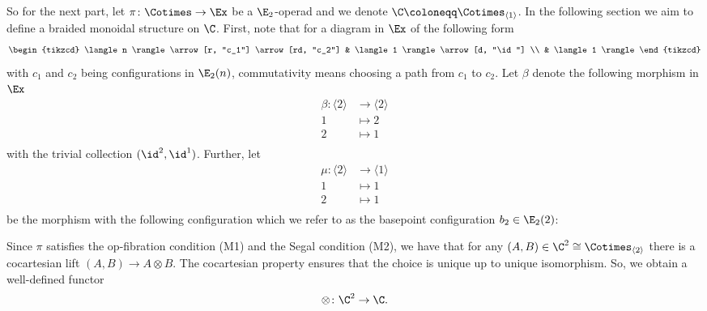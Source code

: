 So for the next part, let $\pi \colon \Cotimes \to \Ex$ be a $\E_2$-operad and we denote $\C \coloneqq \Cotimes_{\langle 1 \rangle}$.
In the following section we aim to define a braided monoidal structure on $\C$.
First, note that for a diagram in $\Ex$ of the following form
\[
    \begin{tikzcd}
        \langle n \rangle \arrow[r, "c_1"] \arrow[rd, "c_2"] & \langle 1 \rangle \arrow[d, "\id"] \\
                                                            & \langle 1 \rangle                                                               
    \end{tikzcd}
\]
with $c_1$ and $c_2$ being configurations in $\E_2(n)$, commutativity means choosing a path from $c_1$ to $c_2$.
Let $\beta$ denote the following morphism in $\Ex$
     \begin{align*}
         \beta \colon \langle 2 \rangle &\to \langle 2 \rangle \\
         1 &\mapsto 2 \\
         2 &\mapsto 1 \\
     \end{align*}
with the trivial collection $(\id^2, \id^1)$.
Further, let 
\begin{align*}
    \mu \colon \langle 2 \rangle &\to \langle 1 \rangle \\
    1 &\mapsto 1 \\
    2 &\mapsto 1 \\
\end{align*}
be the morphism with the following configuration which we refer to as the 
basepoint configuration $b_2 \in \E_2(2)$:


\begin{center}
\end{center}

Since $\pi$ satisfies the op-fibration condition (M1) and the Segal condition (M2), we have that for any $(A,B) \in \C^2 \cong \Cotimes_{\langle 2 \rangle}$ 
there is a cocartesian lift $(A,B) \to A \otimes B$. The cocartesian property ensures that the choice is 
unique up to unique isomorphism.
So, we obtain a well-defined functor
\[
    \otimes \colon \C^2 \to \C.
\]

